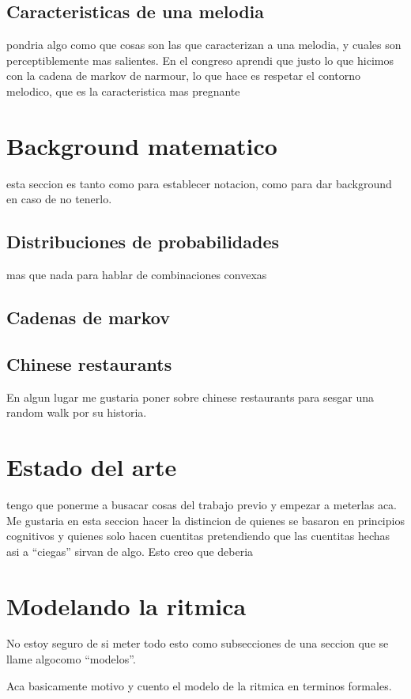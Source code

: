 \documentclass[a4paper,11pt]{article}
\begin{document}
\subsection{Caracteristicas de una melodia}
pondria algo como que cosas son las que caracterizan a una melodia, y cuales son perceptiblemente mas salientes.
En el congreso aprendi que justo lo que hicimos con la cadena de markov de narmour, lo que hace
es respetar el contorno melodico, que es la caracteristica mas pregnante


\section{Background matematico}
esta seccion es tanto como para establecer notacion, como para dar background en caso de no tenerlo.
\subsection{Distribuciones de probabilidades}
mas que nada para hablar de combinaciones convexas
\subsection{Cadenas de markov}

\subsection{Chinese restaurants}
En algun lugar me gustaria poner sobre chinese restaurants para sesgar una random walk por su historia.


\section{Estado del arte}
tengo que ponerme a busacar cosas del trabajo previo y empezar a meterlas aca.
Me gustaria en esta seccion hacer la distincion de quienes se basaron en principios cognitivos y quienes solo hacen cuentitas
pretendiendo que las cuentitas hechas asi a ``ciegas'' sirvan de algo. 
Esto creo que deberia 

\section{Modelando la ritmica}
No estoy seguro de si meter todo esto como subsecciones de una seccion que se llame algocomo ``modelos''.

Aca basicamente motivo y cuento el modelo de la ritmica en terminos formales.
\end{document}
